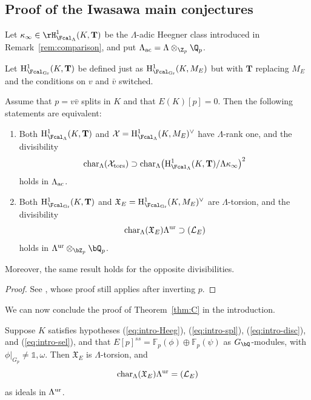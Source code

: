 \subsection{Proof of the Iwasawa main conjectures}

Let $\kappa_\infty\in\rH^1_{\Fcal_\Lambda}(K,\mathbf{T})$ be the $\Lambda$-adic Heegner class introduced in Remark~\ref{rem:comparison}, and %
put $\Lambda_{\rm ac}=\Lambda\otimes_{\Z_p}\Q_p$.
{Let ${\rm H}^1_{\Fcal_{\rm Gr}}(K,\mathbf{T})$ be defined just as ${\rm H}^1_{\Fcal_{\rm Gr}}(K,M_E)$ but with
$\mathbf{T}$ replacing $M_E$ and the conditions on $v$ and $\bar v$ switched.

\begin{prop}
\notready\label{prop:equiv-imc}
Assume that $p=v\bar{v}$ splits in $K$ and that $E(K)[p]=0$.
Then the following statements are equivalent:
\begin{enumerate}
\item[(i)] Both ${\rm H}^1_{\Fcal_\Lambda}(K,\mathbf{T})$ and
$\mathcal{X} = {\rm H}^1_{\Fcal_\Lambda}(K,M_E)^\vee$ have $\Lambda$-rank one, and the divisibility
\[
\mathrm{char}_\Lambda(\mathcal{X}_{\rm tors}) \supset\mathrm{char}_\Lambda\bigl({\rm H}^1_{\Fcal_\Lambda}(K,\mathbf{T})/\Lambda\kappa_\infty\bigr)^2
\]
holds in $\Lambda_{\rm ac}$.
\item[(ii)]  Both ${\rm H}^1_{\Fcal_{\rm Gr}}(K,\mathbf{T})$ and $\mathfrak{X}_{E} = {\rm H}^1_{\Fcal_{\rm Gr}}(K,M_E)^\vee$ are $\Lambda$-torsion, and the divisibility
\[
\mathrm{char}_\Lambda(\mathfrak{X}_{E})\Lambda^{\rm ur}\supset(\mathcal{L}_E)
\]
holds in $\Lambda^{\rm ur}\otimes_{\bZ_p}\bQ_p$.
\end{enumerate}
Moreover, the same result holds for the opposite divisibilities.
\end{prop}
}

\begin{proof}
See \cite[Thm.~5.2]{BCK}, whose proof still applies after inverting $p$.
\end{proof}

We can now conclude the proof of Theorem~\ref{thm:C} in the introduction.

\begin{theorem}
\notready\label{thm:thmA}
Suppose $K$ satisfies hypotheses {\rm (\ref{eq:intro-Heeg})}, {\rm (\ref{eq:intro-spl})}, {\rm (\ref{eq:intro-disc})}, and
{\rm (\ref{eq:intro-sel})}, and that
$E[p]^{ss}=\mathbb{F}_p(\phi)\oplus\mathbb{F}_p(\psi)$ as $G_\bQ$-modules, with $\phi\vert_{G_p}\neq\mathds{1},\omega$.
Then $\mathfrak{X}_E$ is $\Lambda$-torsion, and
\[
{\rm char}_\Lambda(\mathfrak{X}_E)\Lambda^{\rm ur}=(\mathcal{L}_E)
\]
as ideals in $\Lambda^{\rm ur}$.
\end{theorem}

